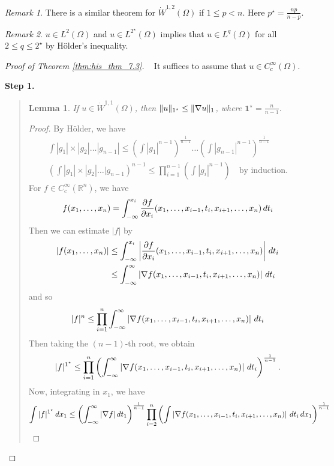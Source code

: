 \documentclass[10pt, oneside, reqno]{amsart}
\theoremstyle{plain}%
\newtheorem{lem}[thm]{Lemma}
\numberwithin{equation}{section}
\theoremstyle{definition}
\theoremstyle{remark}
\newtheorem*{rem}{Remark}
\newcommand{\R}{\mathbb{R}}
\begin{document}
\begin{rem}
	There is a similar theorem for $\dot W^{1, 2}(\Omega)$ if $1 \leq p < n$.  Here $p^\star = \frac{np}{n - p}$.
\end{rem}

\begin{rem}
	$u \in L^2(\Omega)$ and $u \in L^{2^\star}(\Omega)$ implies that $u \in L^{q}(\Omega)$ for all $2 \leq q \leq 2^\star$ by H\"older's inequality.
\end{rem}

\begin{proof}[Proof of Theorem \ref{thm:his_thm_7.3}]{\ }
	It suffices to assume that $u \in C^\infty_c(\Omega)$.
	
	\textbf{Step 1.} 
	\begin{quote}
	\begin{lem}
		If $u \in \dot W^{1, 1}(\Omega)$, then $\| u \|_{1^\star} \leq \| \nabla u \|_{1}$, where $\mathbf{1}^\star = \frac{n}{n-1}$.
	\end{lem}
	
	\begin{proof}
		By H\"older, we have \begin{align*}
			\int |g_1| \times |g_2| \dots  |g_{n-1}| \leq \left( \int |g_1|^{n-1}\right)^{\frac{1}{n-1}} \dots \left( \int |g_{n-1}|^{n-1} \right)^{\frac{1}{n-1}} \\
			\left( \int |g_1| \times |g_2| \dots |g_{n-1} \right)^{n-1} \leq \prod_{i=1}^{n-1} \left( \int |g_i|^{n-1} \right) \quad \text{by induction.}
		\end{align*}
		For $f \in C^{\infty}_c(\R^n)$, we have \[
			f(x_1, \dots, x_n) = \int_{-\infty}^{x_i} \frac{\partial f}{\partial x_i}(x_1, \dots, x_{i-1}, t_i, x_{i+1}, \dots, x_n) \, dt_i
		\]  Then we can estimate $|f|$ by \begin{align*}
			|f(x_1, \dots, x_n)| &\leq \int_{-\infty}^{x_i} \left| \frac{\partial f}{\partial x_i}(x_1, \dots, x_{i-1}, t_i, x_{i+1}, \dots, x_n) \right| \, dt_i \\
			&\leq \int_{-\infty}^{\infty} \left| \nabla f (x_1, \dots, x_{i-1}, t_i, x_{i+1}, \dots, x_n) \right| \, dt_i
		\end{align*} and so \[
			|f|^n \leq \prod_{i=1}^n \int_{-\infty}^{\infty} \left| \nabla f (x_1, \dots, x_{i-1}, t_i, x_{i+1}, \dots, x_n) \right| \, dt_i
		\]  Then taking the $(n-1)$-th root, we obtain \begin{align*}
			|f|^{1^\star} \leq \prod_{i=1}^n \left( \int_{-\infty}^{\infty} \left| \nabla f (x_1, \dots, x_{i-1}, t_i, x_{i+1}, \dots, x_n) \right| \, dt_i \right)^{\frac{1}{n-1}}.
		\end{align*}  Now, integrating in $x_1$, we have \begin{align*}
			\int |f|^{1^\star} \, dx_1 \leq \left( \int_{-\infty}^{\infty} |\nabla f | \, dt_1 \right)^{\frac{1}{n-1}} \prod_{i=2}^n \left(\int \left|\nabla f(x_1, \dots, x_{i-1}, t_i, x_{i+1}, \dots, x_n) \right| \, dt_i \, dx_1 \right)^{\frac{1}{n-1}}
		\end{align*} 
		

\end{proof}
\end{quote}
\end{proof}
\end{document}
